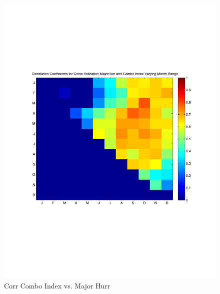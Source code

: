\documentclass[]{article}
\begin{document}
\begin{figure}[ht]
\begin{minipage}[b]{0.6\linewidth}
\includegraphics[width=\textwidth]{figures/comboIndex/crossValidation/monthlySensitivityTestMajorHurr.pdf}
\caption{Corr Combo Index vs. Major Hurr}
\label{fig:figure38}
\end{minipage}
\end{figure}
\end{document}
